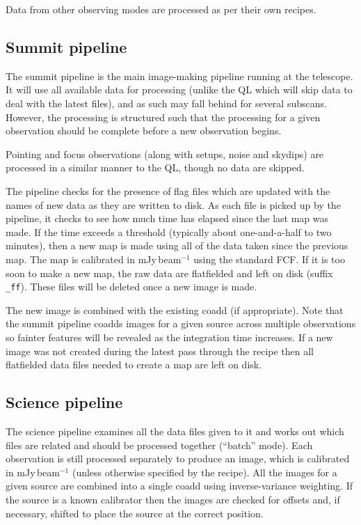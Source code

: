 \documentclass[twoside,11pt]{article}
\renewcommand{\_}{\texttt{\symbol{95}}}
\begin{document}
Data from other observing modes are processed as per their own recipes.

\subsection{Summit pipeline}

The summit pipeline is the main image-making pipeline running at the
telescope. It will use all available data for processing (unlike the
QL which will skip data to deal with the latest files), and as such
may fall behind for several subscans. However, the processing is
structured such that the processing for a given observation should be
complete before a new observation begins.

Pointing and focus observations (along with setups, noise and skydips)
are processed in a similar manner to the QL, though no data are
skipped.

The pipeline checks for the presence of flag files which are updated
with the names of new data as they are written to disk. As each file
is picked up by the pipeline, it checks to see how much time has
elapsed since the last map was made. If the time exceeds a threshold
(typically about one-and-a-half to two minutes), then a new map is
made using all of the data taken since the previous map. The map is
calibrated in mJy\,beam$^{-1}$ using the standard FCF. If it is too
soon to make a new map, the raw data are flatfielded and left on disk
(suffix \verb+_ff+). These files will be deleted once a new image is
made.

The new image is combined with the existing coadd (if
appropriate). Note that the summit pipeline coadds images for a given
source across multiple observations so fainter features will be
revealed as the integration time increases. If a new image was not
created during the latest pass through the recipe then all flatfielded
data files needed to create a map are left on disk.

\subsection{Science pipeline}

The science pipeline examines all the data files given to it and works
out which files are related and should be processed together
(``batch'' mode). Each observation is still processed separately to
produce an image, which is calibrated in mJy\,beam$^{-1}$ (unless
otherwise specified by the recipe). All the images for a given source
are combined into a single coadd using inverse-variance weighting. If
the source is a known calibrator then the images are checked for
offsets and, if necessary, shifted to place the source at the correct
position.
\end{document}
